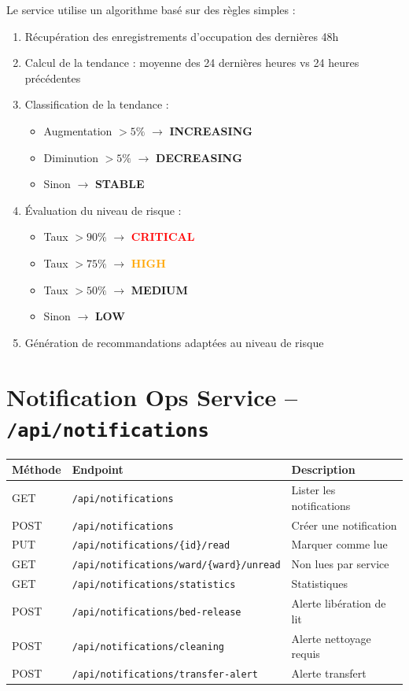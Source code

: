 \documentclass[12pt,a4paper]{report}
\begin{document}
Le service utilise un algorithme bas\'e sur des r\`egles simples :

\begin{enumerate}
    \item R\'ecup\'eration des enregistrements d'occupation des derni\`eres 48h
    \item Calcul de la tendance : moyenne des 24 derni\`eres heures vs 24 heures pr\'ec\'edentes
    \item Classification de la tendance :
    \begin{itemize}
        \item Augmentation $> 5\%$ $\rightarrow$ \textbf{INCREASING}
        \item Diminution $> 5\%$ $\rightarrow$ \textbf{DECREASING}
        \item Sinon $\rightarrow$ \textbf{STABLE}
    \end{itemize}
    \item \'Evaluation du niveau de risque :
    \begin{itemize}
        \item Taux $> 90\%$ $\rightarrow$ \textcolor{red}{\textbf{CRITICAL}}
        \item Taux $> 75\%$ $\rightarrow$ \textcolor{orange}{\textbf{HIGH}}
        \item Taux $> 50\%$ $\rightarrow$ \textcolor{yellow!80!black}{\textbf{MEDIUM}}
        \item Sinon $\rightarrow$ \textcolor{green!60!black}{\textbf{LOW}}
    \end{itemize}
    \item G\'en\'eration de recommandations adapt\'ees au niveau de risque
\end{enumerate}

\section{Notification Ops Service -- \texttt{/api/notifications}}

\begin{longtable}{llp{7cm}}
    \toprule
    \textbf{M\'ethode} & \textbf{Endpoint} & \textbf{Description} \\
    \midrule
    \endhead
    GET & \texttt{/api/notifications} & Lister les notifications \\
    POST & \texttt{/api/notifications} & Cr\'eer une notification \\
    PUT & \texttt{/api/notifications/\{id\}/read} & Marquer comme lue \\
    GET & \texttt{/api/notifications/ward/\{ward\}/unread} & Non lues par service \\
    GET & \texttt{/api/notifications/statistics} & Statistiques \\
    POST & \texttt{/api/notifications/bed-release} & Alerte lib\'eration de lit \\
    POST & \texttt{/api/notifications/cleaning} & Alerte nettoyage requis \\
    POST & \texttt{/api/notifications/transfer-alert} & Alerte transfert \\
    \bottomrule
\end{longtable}
\end{document}
